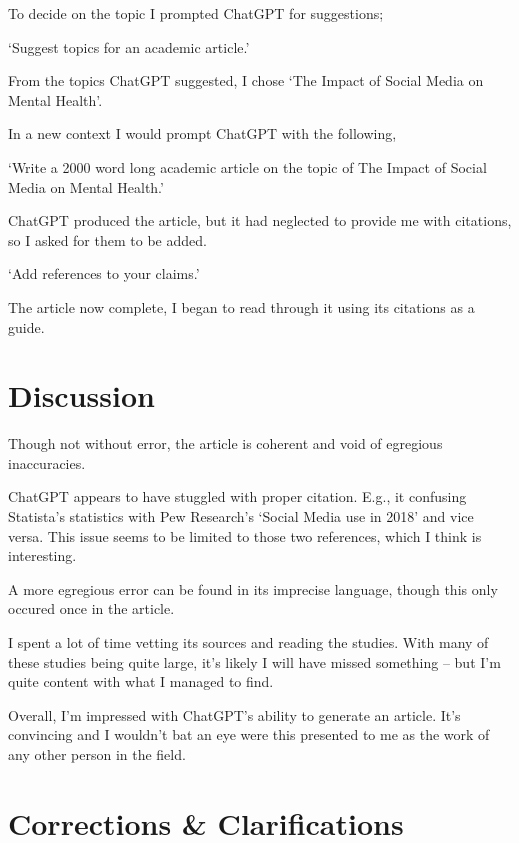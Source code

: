 \documentclass[12pt]{article}
\begin{document}
To decide on the topic I prompted ChatGPT for suggestions;
\begin{center}
    `Suggest topics for an academic article.'
\end{center}
From the topics ChatGPT suggested, I chose `The Impact of Social Media on Mental Health'.

In a new context I would prompt ChatGPT with the following,
\begin{center}
    `Write a 2000 word long academic article on the topic of The Impact of Social Media on Mental Health.'
\end{center}

ChatGPT produced the article, but it had neglected to provide me with citations, so I asked for them to be added.

\begin{center}
    `Add references to your claims.'
\end{center}

The article now complete, I began to read through it using its citations as a guide.

\section{Discussion}

Though not without error, the article is coherent and void of egregious inaccuracies.

ChatGPT appears to have stuggled with proper citation. E.g., it confusing Statista's statistics with Pew Research's `Social Media use in 2018' and vice versa. This issue seems to be limited to those two references, which I think is interesting.

A more egregious error can be found in its imprecise language, though this only occured once in the article.

I spent a lot of time vetting its sources and reading the studies. With many of these studies being quite large, it's likely I will have missed something -- but I'm quite content with what I managed to find.

Overall, I'm impressed with ChatGPT's ability to generate an article. It's convincing and I wouldn't bat an eye were this presented to me as the work of any other person in the field.

\section{Corrections \& Clarifications}
\end{document}
